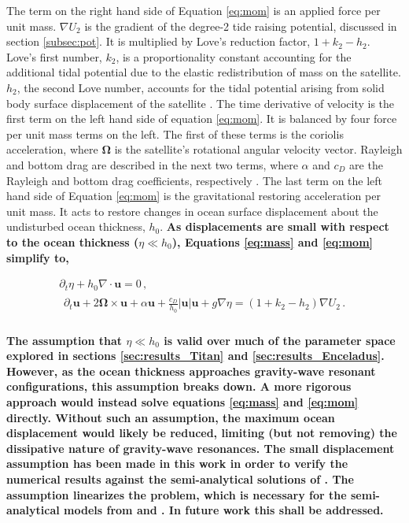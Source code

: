 The term on the right hand side of Equation \ref{eq:mom} is an applied force per unit mass. $\nabla U_2$ is the gradient of the degree-2 tide raising potential, discussed in section \ref{subsec:pot}. It is multiplied by Love's reduction factor, $1 + k_2 - h_2$. Love's first number, $k_2$, is a proportionality constant accounting for the additional tidal potential due to the elastic redistribution of mass on the satellite. $h_2$, the second Love number, accounts for the tidal potential arising from solid body surface displacement of the satellite \citep{love1911some}. The time derivative of velocity is the first term on the left hand side of equation  \ref{eq:mom}. It is balanced by four force per unit mass terms on the left. The first of these terms is the coriolis acceleration, where $\bm{\Omega}$ is the satellite's rotational angular velocity vector. Rayleigh and bottom drag are described in the next two terms, where $\alpha$ and $c_D$ are the Rayleigh and bottom drag coefficients, respectively \citep{sears1995tidal,chen2013tidal}. The last term on the left hand side of Equation \ref{eq:mom} is the gravitational restoring acceleration per unit mass. It acts to restore changes in ocean surface displacement about the undisturbed ocean thickness, $h_0$. \textbf{As displacements are small with respect to the ocean thickness ($\eta \ll h_0$),  Equations \ref{eq:mass} and \ref{eq:mom} simplify to,  }

\vspace{-0.5cm}
\begin{gather}
\partial_t \eta + h_0 \nabla \cdot \bm{u} = 0\, , \label{eq:mass_lin}\\
\begin{aligned} 
\partial_t \bm{u} + 2 \bm{\Omega} \times \bm{u} + \alpha\bm{u} + \frac{c_D}{h_0} \left|\bm{u}\right| \bm{u}  + g \nabla \eta = (1 + k_2 - h_2) \nabla U_2 \, . \label{eq:mom_lin}\\
\end{aligned} 
\end{gather}

\noindent \textbf{The assumption that $\eta \ll h_0$ is valid over much of the parameter space explored in sections \ref{sec:results_Titan} and \ref{sec:results_Enceladus}. However, as the ocean thickness approaches gravity-wave resonant configurations, this assumption breaks down. A more rigorous approach would instead solve equations \ref{eq:mass} and \ref{eq:mom} directly. Without such an assumption, the maximum ocean displacement would likely be reduced, limiting (but not removing) the dissipative nature of gravity-wave resonances. The small displacement assumption has been made in this work in order to verify the numerical results against the semi-analytical solutions of \citet{matsuyama2014tidal}. The assumption linearizes the problem, which is necessary for the semi-analytical models from \citet{tyler2011tidal} and \citet{matsuyama2014tidal}. In future work this shall be addressed.}      

